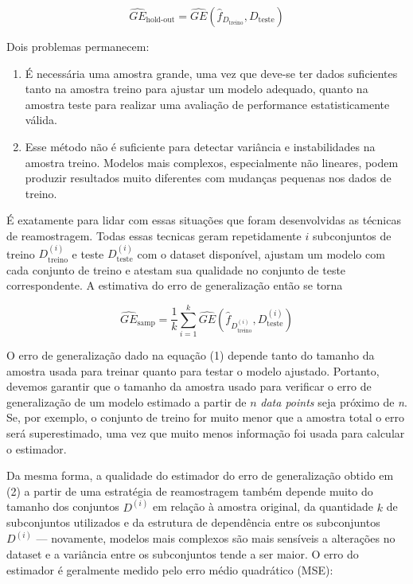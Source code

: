 \documentclass[
  12pt,
  oneside,
  a4paper,
  chapter=TITLE,
  section=TITLE,
  brazil]{abntex2}
\begin{document}
\[\widehat{GE}_\text{hold-out} = \widehat{GE}(\hat{f}_{D_{\text{treino}}}, D_{\text{teste}})\]

Dois problemas permanecem:

\begin{enumerate}
\def\labelenumi{\arabic{enumi}.}
\item
  É necessária uma amostra grande, uma vez que deve-se ter dados
  suficientes tanto na amostra treino para ajustar um modelo adequado,
  quanto na amostra teste para realizar uma avaliação de performance
  estatisticamente válida.
\item
  Esse método não é suficiente para detectar variância e instabilidades
  na amostra treino. Modelos mais complexos, especialmente não lineares,
  podem produzir resultados muito diferentes com mudanças pequenas nos
  dados de treino.
\end{enumerate}

É exatamente para lidar com essas situações que foram desenvolvidas as
técnicas de reamostragem. Todas essas tecnicas geram repetidamente \(i\)
subconjuntos de treino \(D_{\text{treino}}^{(i)}\) e teste
\(D_{\text{teste}}^{(i)}\) com o dataset disponível, ajustam um modelo
com cada conjunto de treino e atestam sua qualidade no conjunto de teste
correspondente. A estimativa do erro de generalização então se torna

\[\widehat{GE}_\text{samp} = \frac{1}{k}\sum_{i=1}^{k}\widehat{GE}(\hat{f}_{D_{\text{treino}}^{(i)}}, D_{\text{teste}}^{(i)}) \tag{2}\]

O erro de generalização dado na equação (1) depende tanto do tamanho da
amostra usada para treinar quanto para testar o modelo ajustado.
Portanto, devemos garantir que o tamanho da amostra usado para verificar
o erro de generalização de um modelo estimado a partir de \(n\)
\emph{data points} seja próximo de \emph{n}. Se, por exemplo, o conjunto
de treino for muito menor que a amostra total o erro será superestimado,
uma vez que muito menos informação foi usada para calcular o estimador.

Da mesma forma, a qualidade do estimador do erro de generalização obtido
em (2) a partir de uma estratégia de reamostragem também depende muito
do tamanho dos conjuntos \(D^{(i)}\) em relação à amostra original, da
quantidade \(k\) de subconjuntos utilizados e da estrutura de
dependência entre os subconjuntos \(D^{(i)}\) --- novamente, modelos
mais complexos são mais sensíveis a alterações no dataset e a variância
entre os subconjuntos tende a ser maior. O erro do estimador é
geralmente medido pelo erro médio quadrático (MSE):
\end{document}
